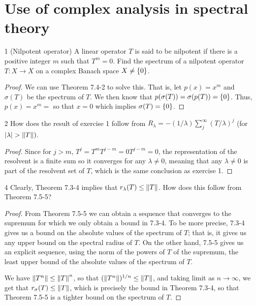 \section{Use of complex analysis in spectral theory}


\begin{exercise}{1 (Nilpotent operator)}
A linear operator $T$ is said to be nilpotent if there is a positive integer $m$ such that $T^m = 0$.
Find the spectrum of a nilpotent operator $T: X \to X$ on a complex Banach space $X \neq \{0\}$.
\end{exercise}
\begin{proof}
We can use Theorem 7.4-2 to solve this.
That is, let $p(x) = x^m$ and $\sigma(T)$ be the spectrum of $T$. 
We then know that $p(\sigma(T)) = \sigma(p(T)) = \{0\}$.
Thus, $p(x) = x^m = $ so that $x = 0$ which implies $\sigma(T) = \{0\}$.
\end{proof} 

\begin{exercise}{2}
How does the result of exercise 1 follow from $R_\lambda = -(1 / \lambda) \sum_j^\infty (T / \lambda)^j$ (for $\left\lvert \lambda\right\rvert > \left\lVert T\right\rVert)$.
\end{exercise}
\begin{proof}
Since for $j > m$, $T^{j} = T^m T^{j-m} = 0 T^{j-m} = 0$, the representation of the resolvent is a finite sum so it converges for any $\lambda \neq 0$, meaning that any $\lambda \neq 0$ is part of the resolvent set of $T$, which is the same conclusion as exercise 1.
\end{proof} 

\begin{exercise}{4}
Clearly, Theorem 7.3-4 implies that $r_\lambda(T) \leq \left\lVert T\right\rVert$.
How does this follow from Theorem 7.5-5?
\end{exercise}
\begin{proof}
From Theorem 7.5-5 we can obtain a sequence that converges to the supremum for which we only obtain a bound in 7.3-4.
To be more precise, 7.3-4 gives us a bound on the absolute values of the spectrum of $T$;
that is, it gives us any upper bound on the spectral radius of $T$.
On the other hand, 7.5-5 gives us an explicit sequence, using the norm of the powers of $T$ of the supremum, the least upper bound of the absolute values of the spectrum of $T$.

We have $\left\lVert T^n\right\rVert \leq \left\lVert T\right\rVert^n$, so that $(\left\lVert T^n\right\rVert)^{1/n} \leq \left\lVert T\right\rVert$, and taking limit as $n \to \infty$, we get that $r_\sigma(T) \leq \left\lVert T\right\rVert$, which is precisely the bound in Theorem 7.3-4, so that Theorem 7.5-5 is a tighter bound on the spectrum of $T$.
\end{proof} 

